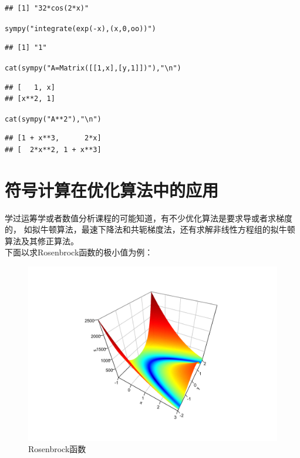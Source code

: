 \documentclass[a4paper]{ctexart}\usepackage[]{graphicx}\usepackage[]{color}
\makeatletter
\newcommand{\hlstr}[1]{\textcolor[rgb]{1,0.4,0.2}{#1}}%
\newcommand{\hlstd}[1]{\textcolor[rgb]{0.251,0.251,0.251}{#1}}%
\newcommand{\hlkwd}[1]{\textcolor[rgb]{0.69,0.188,0.941}{#1}}%
\newenvironment{kframe}{%
 \def\at@end@of@kframe{}%
 \ifinner\ifhmode%
  \def\at@end@of@kframe{\end{minipage}}%
  \begin{minipage}{\columnwidth}%
 \fi\fi%
 \def\FrameCommand##1{\hskip\@totalleftmargin \hskip-\fboxsep
 \colorbox{shadecolor}{##1}\hskip-\fboxsep
     \hskip-\linewidth \hskip-\@totalleftmargin \hskip\columnwidth}%
 \MakeFramed {\advance\hsize-\width
   \@totalleftmargin\z@ \linewidth\hsize
   \@setminipage}}%
 {\par\unskip\endMakeFramed%
 \at@end@of@kframe}
\newenvironment{knitrout}{}{} %
\makeatother
\begin{document}
\begin{knitrout}
\begin{kframe}
\begin{verbatim}
## [1] "32*cos(2*x)"
\end{verbatim}
\begin{alltt}
\hlkwd{sympy}\hlstd{(}\hlstr{"integrate(exp(-x), (x, 0, oo))"}\hlstd{)}
\end{alltt}
\begin{verbatim}
## [1] "1"
\end{verbatim}
\begin{alltt}
\hlkwd{cat}\hlstd{(}\hlkwd{sympy}\hlstd{(}\hlstr{"A = Matrix([[1,x], [y,1]])"}\hlstd{),} \hlstr{"\textbackslash{}n"}\hlstd{)}
\end{alltt}
\begin{verbatim}
## [   1, x]
## [x**2, 1]
\end{verbatim}
\begin{alltt}
\hlkwd{cat}\hlstd{(}\hlkwd{sympy}\hlstd{(}\hlstr{"A**2"}\hlstd{),} \hlstr{"\textbackslash{}n"}\hlstd{)}
\end{alltt}
\begin{verbatim}
## [1 + x**3,      2*x]
## [  2*x**2, 1 + x**3]
\end{verbatim}
\end{kframe}
\end{knitrout}



\section{符号计算在优化算法中的应用}

学过运筹学或者数值分析课程的可能知道，有不少优化算法是要求导或者求梯度的，
如拟牛顿算法，最速下降法和共轭梯度法，还有求解非线性方程组的拟牛顿算法及其修正算法。\\
下面以求Rosenbrock函数的极小值为例：\\
\begin{figure}[htb]
  \centering
    \includegraphics[width=.5\textwidth,height=.5\textwidth]{figure/Rosenbrock.pdf}
  \caption{Rosenbrock函数}
\end{figure}
\end{document}
